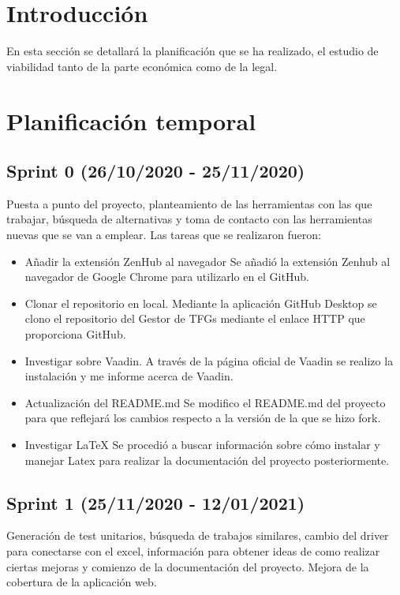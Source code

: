 
\section{Introducción}
En esta sección se detallará la planificación que se ha realizado, el estudio de viabilidad tanto de la parte económica como de la legal.

\section{Planificación temporal}
\subsection{Sprint 0 (26/10/2020 - 25/11/2020)}
Puesta a punto del proyecto, planteamiento de las herramientas con las que trabajar, búsqueda de alternativas y toma de contacto con las herramientas nuevas que se van a emplear.
Las tareas que se realizaron fueron:
\begin{itemize}
	\tightlist
	\item Añadir la extensión ZenHub al navegador
		Se añadió la extensión Zenhub al navegador de Google Chrome para utilizarlo en el GitHub.
	\item Clonar el repositorio en local. 
		Mediante la aplicación GitHub Desktop se clono el repositorio del Gestor de TFGs mediante el enlace HTTP que proporciona GitHub.
	\item Investigar sobre Vaadin.
		A través de la página oficial de Vaadin se realizo la instalación y me informe acerca de Vaadin.
	\item Actualización del README.md 
		Se modifico el README.md del proyecto para que reflejará los cambios respecto a la versión de la que se hizo fork. 
	\item Investigar LaTeX
		Se procedió a buscar información sobre cómo instalar y manejar Latex para realizar la documentación del proyecto posteriormente.
\end{itemize}

\subsection{Sprint 1 (25/11/2020 - 12/01/2021)}
Generación de test unitarios, búsqueda de trabajos similares, cambio del driver para conectarse con el excel, información para obtener ideas de como realizar ciertas mejoras y comienzo de la documentación del proyecto. Mejora de la cobertura de la aplicación web.

